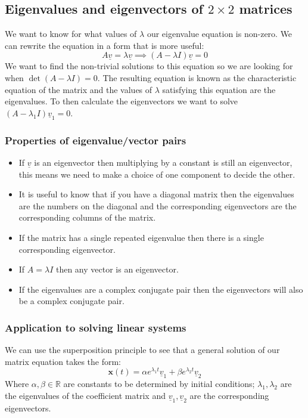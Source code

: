 \documentclass[12pt]{article}
\begin{document}
\subsection*{Eigenvalues and eigenvectors of \(2\times2\) matrices}
We want to know for what values of \(\lambda\) our eigenvalue equation is non-zero. We can rewrite the equation in a form that is more useful:
\[A\underline{v}=\lambda\underline{v}\implies(A-\lambda I)\underline{v}=0\]
We want to find the non-trivial solutions to this equation so we are looking for when \(\det{(A-\lambda I)}=0\). The resulting equation is known as the characteristic equation of the matrix and the values of \(\lambda\) satisfying this equation are the eigenvalues. To then calculate the eigenvectors we want to solve \((A-\lambda_1 I)\underline{v}_1=0\).
\subsubsection*{Properties of eigenvalue/vector pairs}
\begin{itemize}
    \item If \(\underline{v}\) is an eigenvector then multiplying by a constant is still an eigenvector, this means we need to make a choice of one component to decide the other.
    \item It is useful to know that if you have a diagonal matrix then the eigenvalues are the numbers on the diagonal and the corresponding eigenvectors are the corresponding columns of the matrix.
    \item If the matrix has a single repeated eigenvalue then there is a single corresponding eigenvector.
    \item If \(A=\lambda I\) then any vector is an eigenvector.
    \item If the eigenvalues are a complex conjugate pair then the eigenvectors will also be a complex conjugate pair.
\end{itemize}
\subsubsection*{Application to solving linear systems}
We can use the superposition principle to see that a general solution of our matrix equation takes the form:
\[\textbf{x}(t)=\alpha e^{\lambda_1t}\underline{v}_1+\beta e^{\lambda_2t}\underline{v}_2\]
Where \(\alpha,\beta\in \mathbb{R}\) are constants to be determined by initial conditions; \(\lambda_1,\lambda_2\) are the eigenvalues of the coefficient matrix and \(\underline{v}_1,\underline{v}_2\) are the corresponding eigenvectors.
\end{document}
